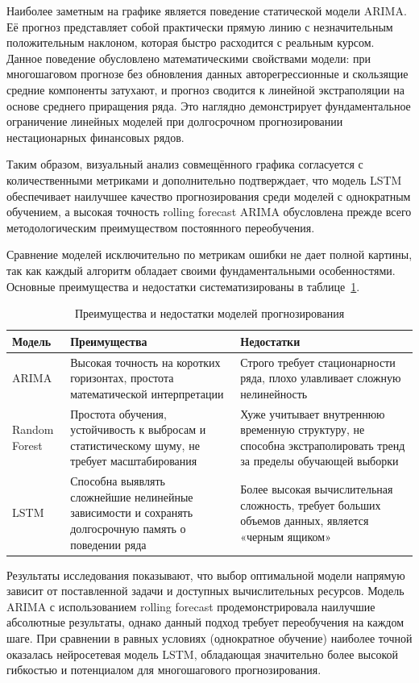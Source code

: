 Наиболее заметным на графике является поведение статической модели ARIMA. Её прогноз представляет собой практически прямую линию с незначительным положительным наклоном, которая быстро расходится с реальным курсом. Данное поведение обусловлено математическими свойствами модели: при многошаговом прогнозе без обновления данных авторегрессионные и скользящие средние компоненты затухают, и прогноз сводится к линейной экстраполяции на основе среднего приращения ряда. Это наглядно демонстрирует фундаментальное ограничение линейных моделей при долгосрочном прогнозировании нестационарных финансовых рядов.

Таким образом, визуальный анализ совмещённого графика согласуется с количественными метриками и дополнительно подтверждает, что модель LSTM обеспечивает наилучшее качество прогнозирования среди моделей с однократным обучением, а высокая точность rolling forecast ARIMA обусловлена прежде всего методологическим преимуществом постоянного переобучения.

Сравнение моделей исключительно по метрикам ошибки не дает полной картины, так как каждый алгоритм обладает своими фундаментальными особенностями. Основные преимущества и недостатки систематизированы в таблице~\ref{tab:models_pros_cons}.
\begin{table}[h!]
\centering
\caption{Преимущества и недостатки моделей прогнозирования}
\label{tab:models_pros_cons}
\begin{tabular}{|l|p{6.2cm}|p{6.2cm}|}
\hline
\textbf{Модель} & \textbf{Преимущества} & \textbf{Недостатки} \\ \hline
ARIMA & 
Высокая точность на коротких горизонтах, простота математической интерпретации & 
Строго требует стационарности ряда, плохо улавливает сложную нелинейность \\ \hline
Random Forest & 
Простота обучения, устойчивость к выбросам и статистическому шуму, не требует масштабирования & 
Хуже учитывает внутреннюю временную структуру, не способна экстраполировать тренд за пределы обучающей выборки \\ \hline
LSTM & 
Способна выявлять сложнейшие нелинейные зависимости и сохранять долгосрочную память о поведении ряда & 
Более высокая вычислительная сложность, требует больших объемов данных, является «черным ящиком» \\ \hline
\end{tabular}
\end{table}

Результаты исследования показывают, что выбор оптимальной модели напрямую зависит от поставленной задачи и доступных вычислительных ресурсов. Модель ARIMA с использованием rolling forecast продемонстрировала наилучшие абсолютные результаты, однако данный подход требует переобучения на каждом шаге. При сравнении в равных условиях (однократное обучение) наиболее точной оказалась нейросетевая модель LSTM, обладающая значительно более высокой гибкостью и потенциалом для многошагового прогнозирования.

